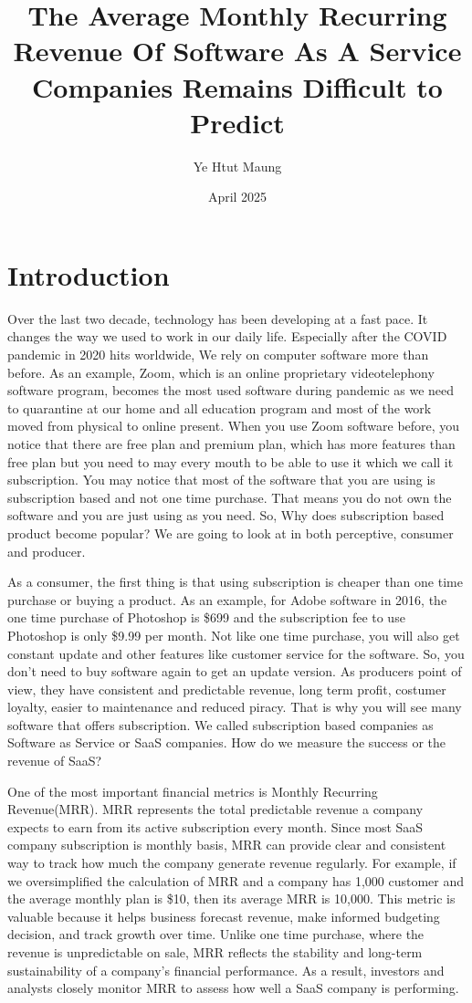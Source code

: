 \documentclass[12pt]{article}
\title{The Average Monthly Recurring Revenue Of Software As A Service Companies Remains Difficult to Predict}
\author{Ye Htut Maung}
\date{April 2025}
\begin{document}
\maketitle

\section{Introduction}

Over the last two decade, technology has been developing at a fast pace. It changes the way we used to work in our daily life. Especially after the COVID pandemic in 2020 hits worldwide, We rely on computer software more than before. As an example, Zoom, which is an online proprietary videotelephony software program, becomes the most used software during pandemic as we need to quarantine at our home and all education program and most of the work moved from physical to online present. When you use Zoom software before, you notice that there are free plan and premium plan, which has more features than free plan but you need to may every mouth to be able to use it which we call it subscription. You may notice that most of the software that you are using is subscription based and not one time purchase. That means you do not own the software and you are just using as you need. So, Why does subscription based product become popular? We are going to look at in both perceptive, consumer and producer. 

As a consumer, the first thing is that using subscription is cheaper than one time purchase or buying a product. As an example, for Adobe software in 2016, the one time purchase of Photoshop is \$699 and the subscription fee to use Photoshop is only \$9.99 per month. Not like one time purchase, you will also get constant update and other features like customer service for the software. So, you don't need to buy software again to get an update version. As producers point of view, they have consistent and predictable revenue, long term profit, costumer loyalty, easier to maintenance and reduced piracy. That is why you will see many software that offers subscription. We called subscription based companies as Software as Service or SaaS companies. How do we measure the success or the revenue of SaaS?

One of the most important financial metrics is Monthly Recurring Revenue(MRR). MRR represents the total predictable revenue a company expects to earn from its active subscription every month. Since most SaaS company subscription is monthly basis, MRR can provide clear and consistent way to track how much the company generate revenue regularly. For example, if we oversimplified the calculation of MRR and a company has 1,000 customer and the average monthly plan is \$10, then its average MRR is 10,000. This metric is valuable because it helps business forecast revenue, make informed budgeting decision, and track growth over time. Unlike one time purchase, where the revenue is unpredictable on sale, MRR reflects the stability and long-term sustainability of a company's financial performance. As a result, investors and analysts closely monitor MRR to assess how well a SaaS company is performing.
\end{document}
